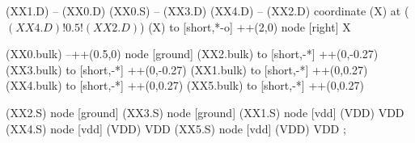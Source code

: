 \begin{circuitikz}[american]
	(XX1.D) -- (XX0.D) 
	(XX0.S) -- (XX3.D)
	(XX4.D) -- (XX2.D)
	coordinate (X) at ($(XX4.D)!0.5!(XX2.D)$)
	(X) to [short,*-o] ++(2,0) node [right] {X}
	
	(XX0.bulk) --++(0.5,0) node [ground]{}
	(XX2.bulk) to [short,-*] ++(0,-0.27)
	(XX3.bulk) to [short,-*] ++(0,-0.27)
	(XX1.bulk) to [short,-*] ++(0,0.27)
	(XX4.bulk) to [short,-*] ++(0,0.27)
	(XX5.bulk) to [short,-*] ++(0,0.27)


	(XX2.S) node [ground] {}
	(XX3.S) node [ground] {}
	(XX1.S) node [vdd] (VDD) {VDD}
	(XX4.S) node [vdd] (VDD) {VDD}
	(XX5.S) node [vdd] (VDD) {VDD}
;

\end{circuitikz}
